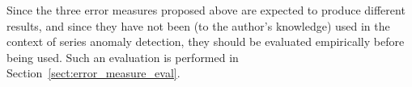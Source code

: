 Since the three error measures proposed above are expected to produce different results, and since they have not been (to the author's knowledge) used in the context of series anomaly detection, they should be evaluated empirically before being used. Such an evaluation is performed in Section~\ref{sect:error_measure_eval}.
